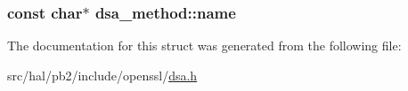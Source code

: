 \subsubsection[{\texorpdfstring{name}{name}}]{\setlength{\rightskip}{0pt plus 5cm}const char$\ast$ dsa\+\_\+method\+::name}\hypertarget{structdsa__method_a83d504a9d8609d6172a7e4a824791933}{}\label{structdsa__method_a83d504a9d8609d6172a7e4a824791933}


The documentation for this struct was generated from the following file\+:\begin{DoxyCompactItemize}
\item 
src/hal/pb2/include/openssl/\hyperlink{dsa_8h}{dsa.\+h}\end{DoxyCompactItemize}
